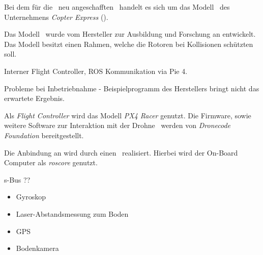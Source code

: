 
Bei dem für die \DHBW\ neu angeschafften \Quad\ handelt es sich um das Modell \Clover\ des Unternehmens \textit{Copter Express} (\COEX).

Das Modell \Clover\ wurde vom Hersteller zur Ausbildung und Forschung an \Quad[n] entwickelt. Das Modell besitzt einen Rahmen, welche die Rotoren bei Kollisionen schützten soll.




Interner Flight Controller, ROS Kommunikation via Pie 4.




Probleme bei Inbetriebnahme - Beispielprogramm des Herstellers bringt nicht das erwartete Ergebnis.




Als \textit{Flight Controller} wird das Modell \textit{PX4 Racer} genutzt. Die Firmware, sowie weitere Software zur Interaktion mit der Drohne \Clover\ werden von \textit{Dronecode Foundation} bereitgestellt.

Die Anbindung an \ROS wird durch einen \Pie\ realisiert. Hierbei wird der On-Board Computer als \textit{roscore} genutzt.


s-Bus ??








\begin{itemize}
\item Gyroskop
\item Laser-Abstandsmessung zum Boden
\item GPS
\item Bodenkamera
\end{itemize}


























